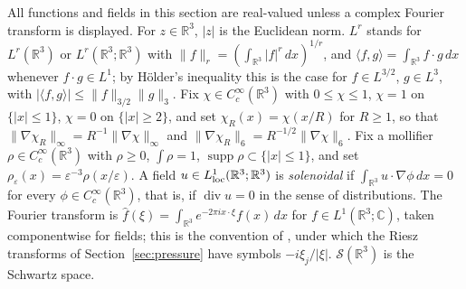\documentclass[11pt]{article}
\theoremstyle{definition}
\theoremstyle{plain}
\newcommand{\R}{\mathbb R}
\newcommand{\norm}[1]{\lVert #1\rVert}
\begin{document}
All functions and fields in this section are real-valued unless a complex
Fourier transform is displayed.  For $z\in\R^3$, $|z|$ is the Euclidean
norm.  $L^r$ stands for $L^r(\R^3)$ or $L^r(\R^3;\R^3)$ with
$\norm f_r=(\int_{\R^3}|f|^r\,dx)^{1/r}$, and
$\langle f,g\rangle=\int_{\R^3}f\cdot g\,dx$ whenever $f\cdot g\in L^1$; by
H\"older's inequality this is the case for $f\in L^{3/2}$, $g\in L^3$,
with $|\langle f,g\rangle|\le\norm f_{3/2}\norm g_3$.  Fix
$\chi\in C_c^\infty(\R^3)$ with $0\le\chi\le1$, $\chi=1$ on
$\{|x|\le1\}$, $\chi=0$ on $\{|x|\ge2\}$, and set $\chi_R(x)=\chi(x/R)$
for $R\ge1$, so that $\norm{\nabla\chi_R}_\infty=R^{-1}\norm{\nabla\chi}_\infty$
and $\norm{\nabla\chi_R}_6=R^{-1/2}\norm{\nabla\chi}_6$.  Fix a mollifier
$\rho\in C_c^\infty(\R^3)$ with $\rho\ge0$, $\int\rho=1$,
$\operatorname{supp}\rho\subset\{|x|\le1\}$, and set
$\rho_\varepsilon(x)=\varepsilon^{-3}\rho(x/\varepsilon)$.  A field
$u\in L^1_{\rm loc}(\R^3;\R^3)$ is \emph{solenoidal} if
$\int_{\R^3}u\cdot\nabla\phi\,dx=0$ for every $\phi\in C_c^\infty(\R^3)$,
that is, if $\operatorname{div}u=0$ in the sense of distributions.  The
Fourier transform is $\hat f(\xi)=\int_{\R^3}e^{-2\pi ix\cdot\xi}f(x)\,dx$
for $f\in L^1(\R^3;\mathbb C)$, taken componentwise for fields; this is
the convention of \cite{Tao2013}, under which the Riesz transforms of
Section~\ref{sec:pressure} have symbols $-i\xi_j/|\xi|$.
$\mathcal S(\R^3)$ is the Schwartz space.
\end{document}
